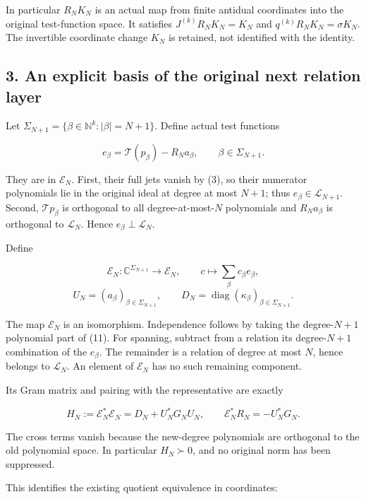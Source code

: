 \documentclass[
]{article}
\begin{document}
In particular \(R_NK_N\) is an actual map from finite antidual
coordinates into the original test-function space. It satisfies
\(J^{(k)}R_NK_N=K_N\) and \(q^{(k)}R_NK_N=\sigma K_N\). The invertible
coordinate change \(K_N\) is retained, not identified with the identity.

\subsection{3. An explicit basis of the original next relation
layer}\label{an-explicit-basis-of-the-original-next-relation-layer}

Let \(\Sigma_{N+1}=\{\beta\in\mathbb N^k:|\beta|=N+1\}\). Define actual
test functions

\[
\boxed{e_\beta=\mathcal T(p_\beta)-R_Na_\beta,
\qquad \beta\in\Sigma_{N+1}.}
\tag{11}
\]

They are in \(\mathcal E_N\). First, their full jets vanish by (3), so
their numerator polynomials lie in the original ideal at degree at most
\(N+1\); thus \(e_\beta\in\mathcal L_{N+1}\). Second,
\(\mathcal T p_\beta\) is orthogonal to all degree-at-most-\(N\)
polynomials and \(R_Na_\beta\) is orthogonal to \(\mathcal L_N\). Hence
\(e_\beta\perp\mathcal L_N\).

Define

\[
\mathscr E_N:\mathbb C^{\Sigma_{N+1}}\longrightarrow\mathcal E_N,
\qquad c\longmapsto\sum_\beta c_\beta e_\beta,
\tag{12}
\] \[
U_N=(a_\beta)_{\beta\in\Sigma_{N+1}},
\qquad D_N=\operatorname{diag}(\kappa_\beta)_{\beta\in\Sigma_{N+1}}.
\tag{13}
\]

The map \(\mathscr E_N\) is an isomorphism. Independence follows by
taking the degree-\(N+1\) polynomial part of (11). For spanning,
subtract from a relation its degree-\(N+1\) combination of the
\(e_\beta\). The remainder is a relation of degree at most \(N\), hence
belongs to \(\mathcal L_N\). An element of \(\mathcal E_N\) has no such
remaining component.

Its Gram matrix and pairing with the representative are exactly

\[
\boxed{H_N:=\mathscr E_N^*\mathscr E_N
=D_N+U_N^*G_NU_N,\qquad
\mathscr E_N^*R_N=-U_N^*G_N.}
\tag{14}
\]

The cross terms vanish because the new-degree polynomials are orthogonal
to the old polynomial space. In particular \(H_N\succ0\), and no
original norm has been suppressed.

This identifies the existing quotient equivalence in coordinates:
\end{document}
